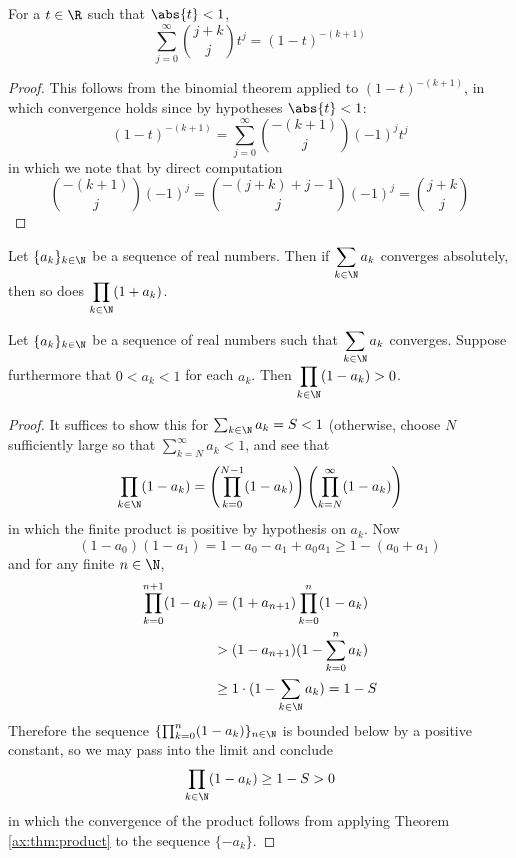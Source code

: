 \begin{thm}\label{ax:thm:binomial}
For a $t \in \R$ such that $\abs{t} < 1$,
\[
\sum_{j=0}^\infty {{j + k} \choose j} t^j = (1-t)^{-(k+1)}
\]
\end{thm}
\begin{proof}
This follows from the binomial theorem applied to $(1-t)^{-(k+1)}$, in which convergence holds since by hypotheses $\abs{t} < 1$:
\[
(1 - t)^{-(k+1)}
= \sum_{j=0}^\infty {{-(k+1)}\choose j}(-1)^jt^j
\]
in which we note that by direct computation
\[
{{-(k+1)}\choose j} (-1)^j
=
{{-(j+k) + j - 1}\choose j} (-1)^j
= {{j + k} \choose j}
\]
\end{proof}

\begin{thm}\label{ax:thm:product}
Let $\{a_k\}_{k \in \N}$ be a sequence of real numbers. Then if
$\displaystyle \sum_{k \in \N} a_k$
converges absolutely, then so does
$\displaystyle \prod_{k\in \N} (1+a_k)$.
\end{thm}


\begin{thm}\label{ax:thm:product-2}
Let $\{a_k\}_{k \in \N}$ be a sequence of real numbers such that
$\displaystyle \sum_{k \in \N} a_k$
converges. Suppose furthermore that $0 < a_k < 1$ for each $a_k$. Then $\displaystyle \prod_{k\in \N} (1-a_k) > 0$.
\end{thm}
\begin{proof}
It suffices to show this for $\sum_{k\in\N} a_k = S < 1$ (otherwise, choose $N$ sufficiently large so that $\sum_{k=N}^\infty a_k < 1$, and see that
\[
\prod_{k\in \N} (1-a_k) = \left(\prod_{k=0}^{N-1} (1-a_k)\right)\left(\prod_{k=N}^{\infty} (1-a_k)\right)
\]
in which the finite product is positive by hypothesis on $a_k$. Now
\[
(1-a_0)(1-a_1) = 1 - a_0 - a_1 + a_0a_1 \ge 1 - (a_0 + a_1)
\]
and for any finite $n \in \N$,
\begin{align*}
\prod_{k=0}^{n+1} (1-a_k) &= (1+a_{n+1}) \prod_{k=0}^{n} (1-a_k)\\
&> (1-a_{n+1})(1-\sum_{k=0}^n a_k)\\
&\ge 1 \cdot (1-\sum_{k\in\N} a_k) = 1-S
\end{align*}
Therefore the sequence
$\{ \prod_{k=0}^{n} (1-a_k) \}_{n\in\N}$ is bounded below by a positive constant, so we may pass into the limit and conclude
\[
\prod_{k\in\N} (1-a_k) \ge 1 - S > 0
\]
in which the convergence of the product follows from applying Theorem \ref{ax:thm:product} to the sequence $\{-a_k\}$.
\end{proof}